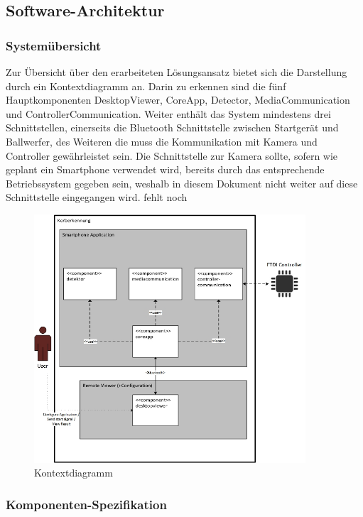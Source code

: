 \subsection{Software-Architektur}
	\subsubsection{Systemübersicht}
	Zur Übersicht über den erarbeiteten Lösungsansatz bietet sich die Darstellung durch ein Kontextdiagramm an. Darin zu erkennen sind die fünf Hauptkomponenten  DesktopViewer, CoreApp, Detector, MediaCommunication und ControllerCommunication. Weiter enthält das System mindestens drei Schnittstellen, einerseits die Bluetooth Schnittstelle zwischen Startgerät und Ballwerfer, des Weiteren die muss die Kommunikation mit Kamera und Controller gewährleistet sein. Die Schnittstelle zur Kamera sollte, sofern wie geplant ein Smartphone verwendet wird, bereits durch das entsprechende Betriebssystem gegeben sein, weshalb in diesem Dokument nicht weiter auf diese Schnittstelle eingegangen wird.
  fehlt noch
\begin{figure}[h!]
		\centering
		\includegraphics[width=0.9\textwidth]{Enddokumentation/Loesungskonzept/Bilder/Kontextdiagramm_v2.jpg}
		\caption{Kontextdiagramm}		
\end{figure}


	\subsubsection{Komponenten-Spezifikation}
